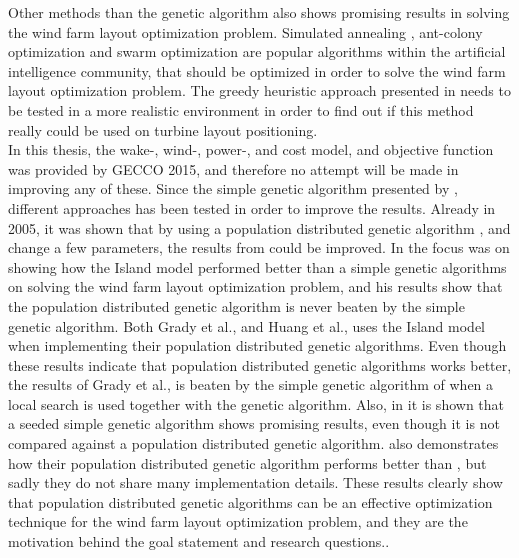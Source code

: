\noindent Other methods than the genetic algorithm also shows promising results in solving the wind farm layout optimization problem. Simulated annealing \citep{Bilbao}, ant-colony optimization \citep{Eroglu} and swarm optimization \citep{Wan2012} are popular algorithms within the artificial intelligence community, that should be optimized in order to solve the wind farm layout optimization problem. The greedy heuristic approach presented in \citep{Ozturk} needs to be tested in a more realistic environment in order to find out if this method really could be used on turbine layout positioning.\\

\noindent In this thesis, the wake-, wind-, power-, and cost model, and objective function was provided by GECCO 2015, and therefore no attempt will be made in improving any of these. Since the simple genetic algorithm presented by \citep{Mosetti}, different approaches has been tested in order to improve the results. Already in 2005, it was shown that by using a population distributed genetic algorithm \citep{Grady}, and change a few parameters, the results from \citep{Mosetti} could be improved. In \citep{Huang} the focus was on showing how the Island model performed better than a simple genetic algorithms on solving the wind farm layout optimization problem, and his results show that the population distributed genetic algorithm is never beaten by the simple genetic algorithm. Both Grady et al., and Huang et al., uses the Island model when implementing their population distributed genetic algorithms. Even though these results indicate that population distributed genetic algorithms works better, the results of Grady et al., is beaten by the simple genetic algorithm of \cite{Gonzalez} when a local search is used together with the genetic algorithm. Also, in \citep{Saavedra-Morena} it is shown that a seeded simple genetic algorithm shows promising results, even though it is not compared against a population distributed genetic algorithm. \cite{Gao} also demonstrates how their population distributed genetic algorithm performs better than \citep{Mosetti, Grady, Gonzalez, Wan}, but sadly they do not share many implementation details. These results clearly show that population distributed genetic algorithms can be an effective optimization technique for the wind farm layout optimization problem, and they are the motivation behind the goal statement and research questions..\\


